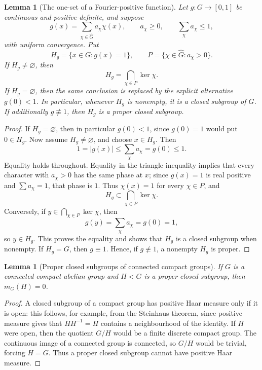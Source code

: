 \documentclass[11pt]{article}
\numberwithin{equation}{section}
\newtheorem{lemma}[theorem]{Lemma}
\newcommand{\1}{\mathbf 1}
\begin{document}
\begin{lemma}[The one-set of a Fourier-positive function]
\label{lem:one-set}
Let \(g:G\to[0,1]\) be continuous and positive-definite, and suppose
\[
        g(x)=\sum_{\chi\in\widehat G} a_\chi\chi(x),
        \qquad
        a_\chi\ge0,
        \qquad
        \sum_\chi a_\chi\le1,
\]
with uniform convergence.  Put
\[
        H_g=\{x\in G:g(x)=1\},
        \qquad
        P=\{\chi\in\widehat G:a_\chi>0\}.
\]
If \(H_g\ne\varnothing\), then
\[
        H_g=\bigcap_{\chi\in P}\ker\chi.
\]
If \(H_g=\varnothing\), then the same conclusion is replaced by the
explicit alternative \(g(0)<1\).  In particular, whenever \(H_g\) is
nonempty, it is a closed subgroup of \(G\).  If additionally \(g\not\equiv1\),
then \(H_g\) is a proper closed subgroup.
\end{lemma}

\begin{proof}
If \(H_g=\varnothing\), then in particular \(g(0)<1\), since \(g(0)=1\)
would put \(0\in H_g\).  Now assume \(H_g\ne\varnothing\), and choose
\(x\in H_g\).  Then
\[
        1=|g(x)|
        \le
        \sum_\chi a_\chi
        =
        g(0)
        \le1.
\]
Equality holds throughout.  Equality in the triangle inequality implies
that every character with \(a_\chi>0\) has the same phase at \(x\); since
\(g(x)=1\) is real positive and \(\sum a_\chi=1\), that phase is \(1\).
Thus \(\chi(x)=1\) for every \(\chi\in P\), and
\[
        H_g\subset\bigcap_{\chi\in P}\ker\chi.
\]
Conversely, if \(y\in\bigcap_{\chi\in P}\ker\chi\), then
\[
        g(y)=\sum_\chi a_\chi=g(0)=1,
\]
so \(y\in H_g\).  This proves the equality and shows that \(H_g\) is a
closed subgroup when nonempty.  If \(H_g=G\), then \(g\equiv1\).  Hence,
if \(g\not\equiv1\), a nonempty \(H_g\) is proper.
\end{proof}

\begin{lemma}[Proper closed subgroups of connected compact groups]
\label{lem:proper-subgroup-null}
If \(G\) is a connected compact abelian group and \(H<G\) is a proper
closed subgroup, then \(m_G(H)=0\).
\end{lemma}

\begin{proof}
A closed subgroup of a compact group has positive Haar measure only if it
is open: this follows, for example, from the Steinhaus theorem, since
positive measure gives that \(HH^{-1}=H\) contains a neighbourhood of the
identity.  If \(H\) were open, then the quotient \(G/H\) would be a finite
discrete compact group.  The continuous image of a connected group is
connected, so \(G/H\) would be trivial, forcing \(H=G\).  Thus a proper
closed subgroup cannot have positive Haar measure.
\end{proof}
\end{document}
